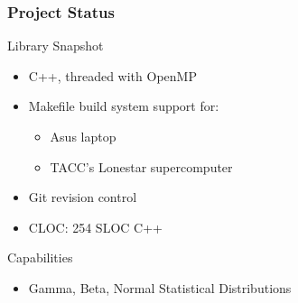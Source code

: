 \documentclass[mathserif]{beamer}
\begin{document}
\begin{frame}
  \frametitle{Project Status}

  \begin{block}{Library Snapshot}
    \begin{itemize}
    \item C++, threaded with OpenMP
    \item Makefile build system support for:
      \begin{itemize}
      \item Asus laptop 
      \item TACC's Lonestar supercomputer
      \end{itemize}
    \item Git revision control 
    \item CLOC: 254 SLOC C++
    \end{itemize}
  \end{block}
    
    \begin{block}{Capabilities}
      \begin{itemize}
      \item Gamma, Beta, Normal Statistical Distributions
      \end{itemize}
    \end{block}
      
\end{frame}
\end{document}

